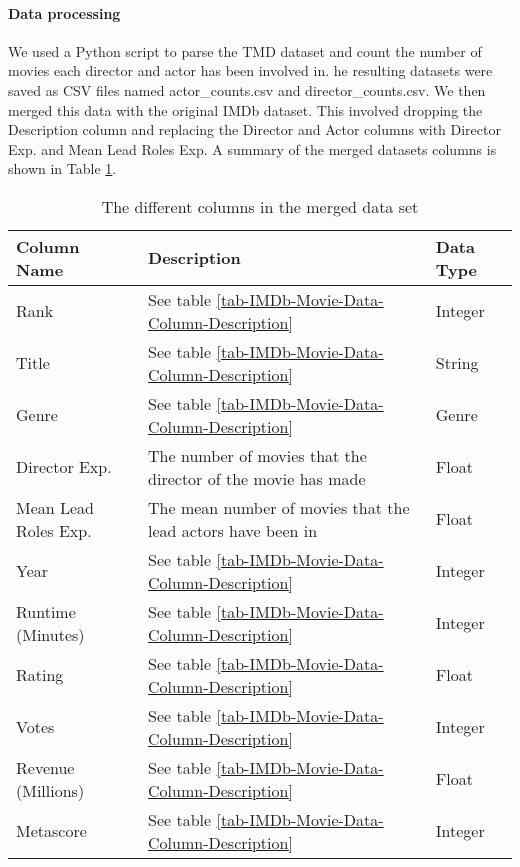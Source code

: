     \paragraph{Data processing}
        We used a Python script to parse the TMD dataset and count the number of
            movies each director and actor has been involved in.
        he resulting datasets were saved as CSV files named actor\_counts.csv and
            director\_counts.csv.
        We then merged this data with the original IMDb
            dataset.
        This involved dropping the Description column and replacing the
            Director and Actor columns with Director Exp. and Mean Lead Roles Exp.
        A summary of the merged datasets columns is shown in Table
            \ref*{tab-merged-data-column-description}.

        \begin{table}[h]
            \begin{tabular}{lp{9cm}l}
                \toprule
                Column Name          & Description                                                  & Data Type \\
                \midrule
                Rank                 & See table \ref*{tab-IMDb-Movie-Data-Column-Description}      & Integer   \\
                Title                & See table \ref*{tab-IMDb-Movie-Data-Column-Description}      & String    \\
                Genre                & See table \ref*{tab-IMDb-Movie-Data-Column-Description}      & Genre     \\
                Director Exp.        & The number of movies that the director of the movie has made & Float     \\
                Mean Lead Roles Exp. & The mean number of movies that the lead actors have been in  & Float     \\
                Year                 & See table \ref*{tab-IMDb-Movie-Data-Column-Description}      & Integer   \\
                Runtime (Minutes)    & See table \ref*{tab-IMDb-Movie-Data-Column-Description}      & Integer   \\
                Rating               & See table \ref*{tab-IMDb-Movie-Data-Column-Description}      & Float     \\
                Votes                & See table \ref*{tab-IMDb-Movie-Data-Column-Description}      & Integer   \\
                Revenue (Millions)   & See table \ref*{tab-IMDb-Movie-Data-Column-Description}      & Float     \\
                Metascore            & See table \ref*{tab-IMDb-Movie-Data-Column-Description}      & Integer   \\
                \bottomrule
            \end{tabular}
            \caption[short]{The different columns in the merged data set}\label{tab-merged-data-column-description}
        \end{table}

